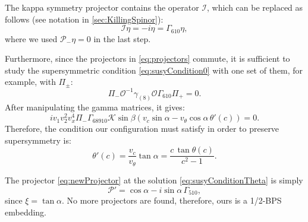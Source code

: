 The kappa symmetry projector contains the operator $\mathcal{I}$, which can be replaced as follows (see notation in \ref{sec:KillingSpinor}):
\begin{equation}
 \mathcal{I}\eta =-i \eta = \Gamma_{610} \eta,
\end{equation}
where we used $\mathcal{P}_- \eta =0$ in the last step. 

Furthermore, since the projectors in \eqref{eq:projectors} commute, it is sufficient to study the supersymmetric condition \eqref{eq:susyCondition0} with one set of them, for example, with $\Pi_\pm$:
\begin{equation}
 \Pi_{-} \mathcal{O}^{-1} \gamma_{(8)} \mathcal{O} \Gamma_{610} \Pi_{+}  = 0.
\end{equation} 
After manipulating the gamma matrices, it gives:
\begin{equation}
i v_1 v_2^2 v_x^4 \Pi_- \Gamma_{6 8 9 10} \mathcal{K} \sin\beta \left(v_c \sin\alpha - v_\theta \cos\alpha \, \theta'(c)\right) = 0.
\end{equation}
Therefore, the condition our configuration must satisfy in order to preserve supersymmetry is:
\begin{equation}\label{eq:susyConditionTheta}
 \theta'(c) = \dfrac{v_c}{v_\theta} \tan\alpha = \dfrac{c \, \tan\theta(c)}{c^2-1} .
\end{equation}


The projector \eqref{eq:newProjector} at the solution \eqref{eq:susyConditionTheta} is simply
\begin{equation}
\mathcal{P}' = \cos \alpha - i \sin \alpha \, \Gamma_{510},
\end{equation}
since $ \xi =  \tan \alpha $.
No more projectors are found, therefore, ours is a 1/2-BPS embedding.



